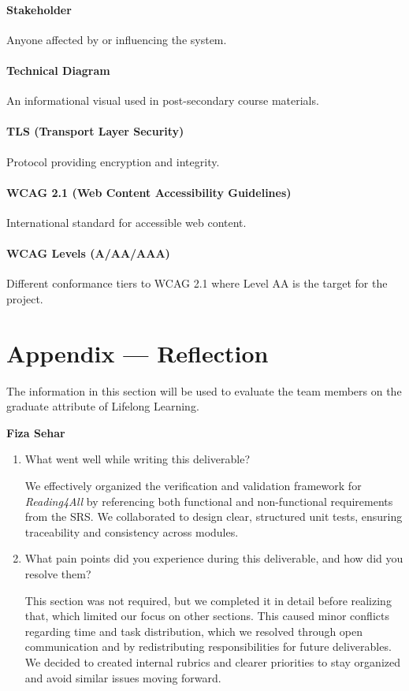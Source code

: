 \documentclass[12pt, titlepage]{article}
\begin{document}
\paragraph*{Stakeholder}
Anyone affected by or influencing the system.

\paragraph*{Technical Diagram}
An informational visual used in post-secondary course materials.

\paragraph*{TLS (Transport Layer Security)}
Protocol providing encryption and integrity.

\paragraph*{WCAG 2.1 (Web Content Accessibility Guidelines)}
International standard for accessible web content.

\paragraph*{WCAG Levels (A/AA/AAA)}
Different conformance tiers to WCAG 2.1 where Level AA is the target
for the project.

\newpage{}
\section*{Appendix --- Reflection}


The information in this section will be used to evaluate the team members on the
graduate attribute of Lifelong Learning.



\textbf{Fiza Sehar}
\begin{enumerate}
  \item What went well while writing this deliverable?

    We effectively organized the verification and validation framework
    for \textit{Reading4All} by referencing both functional and
    non-functional requirements from the SRS. We collaborated to design
    clear, structured unit tests, ensuring traceability and consistency
    across modules.

  \item What pain points did you experience during this deliverable,
    and how did you resolve them?

    This section was not required, but we completed it in detail before
    realizing that, which limited our focus on other sections. This
    caused minor conflicts regarding time and task distribution, which
    we resolved through open communication and by redistributing
    responsibilities for future deliverables. We decided to created
    internal rubrics and clearer priorities to stay organized and avoid
    similar issues moving forward.

\end{enumerate}
\end{document}
